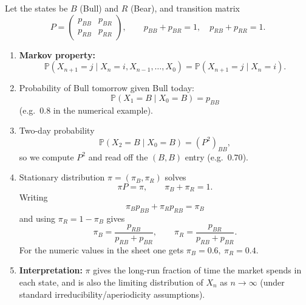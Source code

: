 \documentclass[11pt]{article}
\begin{document}
Let the states be $B$ (Bull) and $R$ (Bear), and transition matrix
\[
P=
\begin{pmatrix}
p_{BB} & p_{BR}\\
p_{RB} & p_{RR}
\end{pmatrix},\qquad
p_{BB}+p_{BR}=1,\quad p_{RB}+p_{RR}=1.
\]

\begin{enumerate}
\item
\textbf{Markov property:}
\[
\mathbb P(X_{n+1}=j\mid X_n=i,X_{n-1},\dots,X_0)
=\mathbb P(X_{n+1}=j\mid X_n=i).
\]

\item
Probability of Bull tomorrow given Bull today:
\[
\mathbb P(X_1=B\mid X_0=B)=p_{BB}
\]
(e.g.\ $0.8$ in the numerical example).

\item
Two-day probability
\[
\mathbb P(X_2=B\mid X_0=B)=(P^2)_{BB},
\]
so we compute $P^2$ and read off the $(B,B)$ entry (e.g.\ $0.70$).

\item
Stationary distribution $\pi=(\pi_B,\pi_R)$ solves
\[
\pi P=\pi,\qquad \pi_B+\pi_R=1.
\]
Writing
\[
\pi_B p_{BB} + \pi_R p_{RB} = \pi_B
\]
and using $\pi_R=1-\pi_B$ gives
\[
\pi_B = \frac{p_{RB}}{p_{RB}+p_{BR}},
\qquad
\pi_R = \frac{p_{BR}}{p_{RB}+p_{BR}}.
\]
For the numeric values in the sheet one gets $\pi_B=0.6,\ \pi_R=0.4$.

\item
\textbf{Interpretation:}
$\pi$ gives the long-run fraction of time the market spends in each state, and is also the limiting distribution of $X_n$ as $n\to\infty$ (under standard irreducibility/aperiodicity assumptions).
\end{enumerate}

\end{document}
